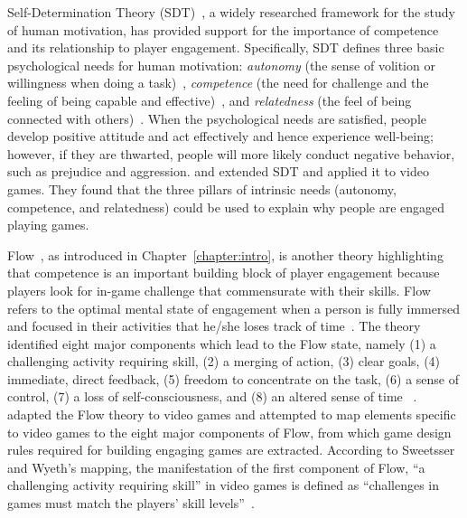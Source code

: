 Self-Determination Theory (SDT)~\citep{ryan2000self}, a widely researched framework for the study of human motivation, has provided support for the importance of competence and its relationship to player engagement. Specifically, SDT defines three basic psychological needs for human motivation: \textit{autonomy} (the sense of volition or willingness when doing a task)~\citep{deci2000and,deci1964empirical}, \textit{competence} (the need for challenge and the feeling of being capable and effective)~\citep{white1959motivation,deci1985intrinsic}, and \textit{relatedness} (the feel of being connected with others)~\citep{ryan2001happiness,la2000within}. When the psychological needs are satisfied, people develop positive attitude and act effectively and hence experience well-being; however, if they are thwarted, people will more likely conduct negative behavior, such as prejudice and aggression. \textcite{ryan2006motivational} and \textcite{przybylski2010motivational} extended SDT and applied it to video games. They found that the three pillars of intrinsic needs (autonomy, competence, and relatedness) could be used to explain why people are engaged playing games. 

Flow~\citep{flow1990psychology}, as introduced in Chapter~\ref{chapter:intro}, is another theory highlighting that competence is an important building block of player engagement because players look for in-game challenge that commensurate with their skills. Flow  refers to the optimal mental state of engagement when a person is fully immersed and focused in their activities that he/she loses track of time~\citep{flow1990psychology}. The theory identified eight major components which lead to the Flow state, namely (1) a challenging activity requiring skill, (2) a merging of action, (3) clear goals, (4) immediate, direct feedback, (5) freedom to concentrate on the task, (6) a sense of control, (7) a loss of self-consciousness, and (8) an altered sense of time ~\citep{flow1990psychology}.   \textcite{sweetser2005gameflow} adapted the Flow theory to video games and attempted to map elements specific to video games to the eight major components of Flow, from which game design rules required for building engaging games are extracted. According to Sweetsser and Wyeth's mapping, the manifestation of the first component of Flow, ``a challenging activity requiring skill'' in video games is defined as ``challenges in games must match the players’ skill levels''~\citep{sweetser2005gameflow}.

